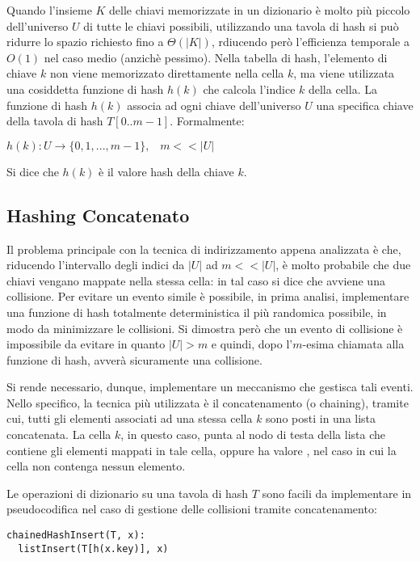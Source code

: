 Quando l'insieme \(K\) delle chiavi memorizzate in un dizionario è molto più piccolo dell'universo \(U\) di tutte le chiavi possibili, utilizzando una tavola di hash si può ridurre lo spazio richiesto fino a \(\Theta(|K|)\), rdiucendo però l'efficienza temporale a \(O(1)\) nel caso medio (anzichè pessimo). Nella tabella di hash, l'elemento di chiave \(k\) non viene memorizzato direttamente nella cella \(k\), ma viene utilizzata una cosiddetta funzione di hash \(h(k)\) che calcola l'indice \(k\) della cella. La funzione di hash \(h(k)\) associa ad ogni chiave dell'universo \(U\) una specifica chiave della tavola di hash \(T[0..m-1]\). Formalmente:

\(h(k):U\to \{0,1,..., m-1\},\;\;\; m<<|U|\)

Si dice che \(h(k)\) è il valore hash della chiave \(k\).

\subsection{Hashing Concatenato}

Il problema principale con la tecnica di indirizzamento appena analizzata è che, riducendo l'intervallo degli indici da \(|U|\) ad \(m<<|U|\), è molto probabile che due chiavi vengano mappate nella stessa cella: in tal caso si dice che avviene una collisione. Per evitare un evento simile è possibile, in prima analisi, implementare una funzione di hash totalmente deterministica il più randomica possibile, in modo da minimizzare le collisioni. Si dimostra però che un evento di collisione è impossibile da evitare in quanto \(|U| > m\) e quindi, dopo l'\(m\)-esima chiamata alla funzione di hash, avverà sicuramente una collisione. 

Si rende necessario, dunque, implementare un meccanismo che gestisca tali eventi. Nello specifico, la tecnica più utilizzata è il concatenamento (o chaining), tramite cui, tutti gli elementi associati ad una stessa cella \(k\) sono posti in una lista concatenata. La cella \(k\), in questo caso, punta al nodo di testa della lista che contiene gli elementi mappati in tale cella, oppure ha valore , nel caso in cui la cella non contenga nessun elemento. 

Le operazioni di dizionario su una tavola di hash \(T\) sono facili da implementare in pseudocodifica nel caso di gestione delle collisioni tramite concatenamento:

\begin{lstlisting}
chainedHashInsert(T, x):
  listInsert(T[h(x.key)], x)
\end{lstlisting}

